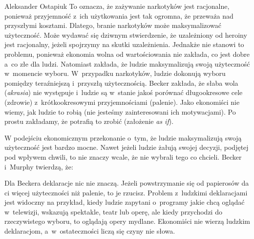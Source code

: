 \begin{artplenv}{Aleksander Ostapiuk}
To oznacza, że zażywanie narkotyków jest racjonalne, ponieważ przyjemność z~ich użytkowania jest tak ogromna, że
przeważa nad przyszłymi kosztami. Dlatego, branie narkotyków może maksymalizować użyteczność. Może wydawać się dziwnym
stwierdzenie, że uzależniony od heroiny jest racjonalny, jeżeli spojrzymy na skutki uzależnienia. Jednakże nie stanowi
to problemu, ponieważ ekonomia wolna od wartościowania nie zakłada, co jest dobre a~co złe dla ludzi. Natomiast
zakłada, że ludzie maksymalizują swoją użyteczność w~momencie wyboru. W~przypadku narkotyków, ludzie dokonują wyboru
pomiędzy teraźniejszą i~przyszłą użytecznością. Becker zakłada, że słaba wola (\textit{akrasia}) nie występuje i~ludzie
są w~stanie jakoś porównać długookresowe cele (zdrowie) z~krótkookresowymi przyjemnościami (palenie). Jako ekonomiści
nie wiemy, jak ludzie to robią (nie jesteśmy zainteresowani ich motywacjami). Po prostu zakładamy, że potrafią to
zrobić (założenie \textit{as if}). 

W podejściu ekonomicznym przekonanie o~tym, że ludzie maksymalizują swoją użyteczność jest bardzo mocne. Nawet jeżeli
ludzie żałują swojej decyzji, podjętej pod wpływem chwili, to nie znaczy wcale, że nie wybrali tego co chcieli. Becker
i~Murphy twierdzą, że:


Dla Beckera deklaracje nic nie znaczą. Jeżeli powstrzymanie się od papierosów da ci więcej użyteczności niż palenie, to
je rzucisz. Problem z~ludzkimi deklaracjami jest widoczny na przykład, kiedy ludzie zapytani o~programy jakie chcą
oglądać w~telewizji, wskazują spektakle, teatr lub operę, ale kiedy przychodzi do rzeczywistego wyboru, to oglądają
opery mydlane. Ekonomiści nie wierzą ludzkim deklaracjom, a~w~ostateczności liczą się czyny nie słowa.


\end{artplenv}
